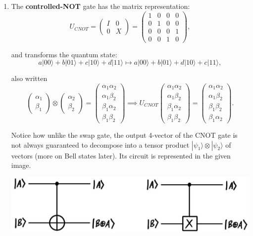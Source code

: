 \documentclass{article}
\theoremstyle{definition}
\begin{document}
      \begin{enumerate}
        \item The \textbf{controlled-NOT} gate has the matrix representation:
          \[U_{CNOT} = \begin{pmatrix} I & 0 \\ 0 & X \end{pmatrix} = \begin{pmatrix} 1&0&0&0\\0&1&0&0\\0&0&0&1\\0&0&1&0 \end{pmatrix},\]

        and transforms the quantum state:
          \[a |00\rangle + b |01\rangle + c|10\rangle + d|11\rangle \mapsto a |00\rangle + b |01\rangle + d|10\rangle + c|11\rangle,\]

        also written
          \[\begin{pmatrix} \alpha_1 \\ \beta_1 \end{pmatrix} \otimes \begin{pmatrix} \alpha_2 \\ \beta_2 \end{pmatrix} = \begin{pmatrix} \alpha_1 \alpha_2 \\ \alpha_1 \beta_2 \\ \beta_1 \alpha_2 \\ \beta_1 \beta_2 \end{pmatrix} \implies U_{CNOT} \begin{pmatrix} \alpha_1 \alpha_2 \\ \alpha_1 \beta_2 \\ \beta_1 \alpha_2 \\ \beta_1 \beta_2 \end{pmatrix} = \begin{pmatrix} \alpha_1 \alpha_2 \\ \alpha_1 \beta_2 \\ \beta_1 \beta_2 \\ \beta_1 \alpha_2 \end{pmatrix}.\]

        Notice how unlike the swap gate, the output 4-vector of the CNOT gate is not always guaranteed to decompose into a tensor product $|\psi_1 \rangle \otimes |\psi_2 \rangle$ of vectors (more on Bell states later). Its circuit is represented in the given image.

        \begin{center}
          \includegraphics[scale=0.3]{img/Control_Not_gate.jpg}
        \end{center}


\end{enumerate}
\end{document}
